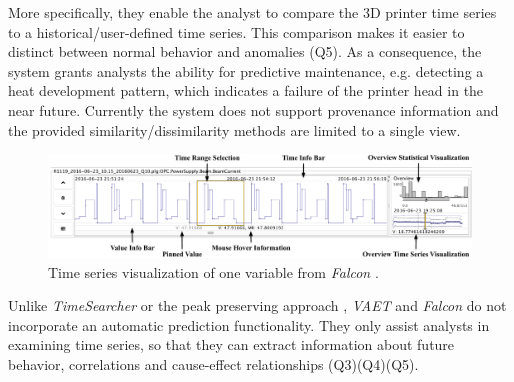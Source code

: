 \documentclass[electronic]{vgtc}             %
\begin{document}
More specifically, they enable the analyst to compare the 3D printer time series to a historical/user-defined time series. 
This comparison makes it easier to distinct between normal behavior and anomalies (Q5). 
As a consequence, the system grants analysts the ability for predictive maintenance, e.g. detecting a heat development pattern, which indicates a failure of the printer head in the near future. 
Currently the system does not support provenance information and the provided similarity/dissimilarity methods are limited to a single view.
\begin{figure}[!t]
	\centering
	\includegraphics[width=\columnwidth]{Falcon}
	\caption{Time series visualization of one variable from \textit{Falcon}  \cite{steed:2017}.
	}
	\label{fig:falcon}
\end{figure}
Unlike \textit{TimeSearcher} \cite{buono:2007} or the peak preserving approach \cite{Hao:2012}, \textit{VAET} \cite{Xie:2014} and \textit{Falcon}  \cite{steed:2017} do not incorporate an automatic prediction functionality.
They only assist analysts in examining time series, so that they can extract information about future behavior, correlations and cause-effect relationships  (Q3)(Q4)(Q5). 
\end{document}
